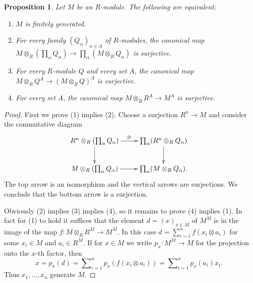 \documentclass[10pt,a4paper]{amsart}
\theoremstyle{plain}
\newtheorem{proposition}[subsection]{Proposition}
\theoremstyle{definition}
\theoremstyle{remark}
\numberwithin{equation}{subsection}
\begin{document}
\begin{proposition}
\label{proposition-fg-tensor}
Let $M$ be an $R$-module.  The following are equivalent:
\begin{enumerate}
\item $M$ is finitely generated.
\item For every family $(Q_{\alpha})_{\alpha \in A}$ of $R$-modules, the
canonical map $M \otimes_R \left( \prod_{\alpha} Q_{\alpha} \right)
\to \prod_{\alpha} (M \otimes_R Q_{\alpha})$ is surjective.
\item For every $R$-module $Q$ and every set $A$, the canonical map $M
\otimes_R Q^{A} \to (M \otimes_R Q)^{A}$ is surjective.
\item For every set $A$, the canonical map $M \otimes_R R^{A} \to
M^{A}$ is surjective.
\end{enumerate}
\end{proposition}

\begin{proof}
First we prove (1) implies (2).  Choose a surjection $R^n \to M$ and
consider the commutative diagram
$$
\xymatrix{
R^n \otimes_R (\prod_{\alpha} Q_{\alpha})  \ar[r]^{\cong} \ar[d] &
\prod_{\alpha} (R^n \otimes_R Q_{\alpha}) \ar[d] \\
M \otimes_R (\prod_{\alpha} Q_{\alpha})  \ar[r] & \prod_{\alpha} ( M
\otimes_R Q_{\alpha}).
}
$$
The top arrow is an isomorphism and the vertical arrows are surjections.  We
conclude that the bottom arrow is a surjection.

\medskip\noindent
Obviously (2) implies (3) implies (4), so it remains to prove (4) implies (1).
In fact for (1) to hold it suffices that the element $d = (x)_{x \in M}$ of
$M^M$ is in the image of the map $f: M \otimes_R R^{M} \to M^M$.  In
this case $d = \sum_{i = 1}^{n} f(x_i \otimes a_i)$ for some $x_i \in M$ and
$a_i \in R^M$.  If for $x \in M$ we write $p_x: M^M \to M$ for the
projection onto the $x$-th factor, then
$$
x = p_x(d) = \sum\nolimits_{i = 1}^{n} p_x(f(x_i \otimes a_i)) =
\sum\nolimits_{i=1}^{n} p_x(a_i) x_i.
$$
Thus $x_1, \ldots, x_n$ generate $M$.
\end{proof}
\end{document}
